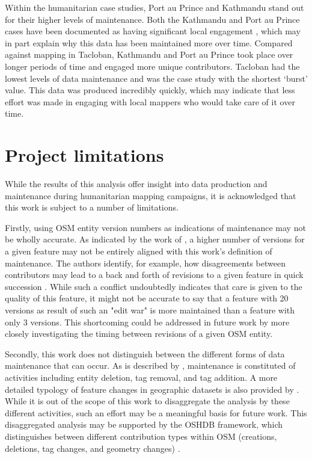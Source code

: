 Within the humanitarian case studies, Port au Prince and Kathmandu stand out for their higher levels of maintenance. Both the Kathmandu and Port au Prince cases have been documented as having significant local engagement \parencite{soden_crowdsourced_2014}, which may in part explain why this data has been maintained more over time. Compared against mapping in Tacloban, Kathmandu and Port au Prince took place over longer periods of time and engaged more unique contributors. Tacloban had the lowest levels of data maintenance and was the case study with the shortest ‘burst’ value. This data was produced incredibly quickly, which may indicate that less effort was made in engaging with local mappers who would take care of it over time. 

\section{Project limitations}

While the results of this analysis offer insight into data production and maintenance during humanitarian mapping campaigns, it is acknowledged that this work is subject to a number of limitations. 

Firstly, using OSM entity version numbers as indications of maintenance may not be wholly accurate. As indicated by the work of \textcite{mooney_characteristics_2012}, a higher number of versions for a given feature may not be entirely aligned with this work's definition of maintenance. The authors identify, for example, how disagreements between contributors may lead to a back and forth of revisions to a given feature in quick succession \textcite{mooney_characteristics_2012}. While such a conflict undoubtedly indicates that care is given to the quality of this  feature, it might not be accurate to say that a feature with 20 versions as result of such an "edit war" is more maintained than a feature with only 3 versions. This shortcoming could be addressed in future work by more closely investigating the timing between revisions of a given OSM entity. 

Secondly, this work does not distinguish between the different forms of data maintenance that can occur. As is described by \textcite{quattrone_work_2017}, maintenance is constituted of activities including entity deletion, tag removal, and tag addition. A more detailed typology of feature changes in geographic datasets is also provided by \textcite{rehrl_towards_2015}. While it is out of the scope of this work to disaggregate the analysis by these different activities, such an effort may be a meaningful basis for future work. This disaggregated analysis may be supported by the OSHDB framework, which distinguishes between different contribution types within OSM (creations, deletions, tag changes, and geometry changes) \parencite{heidelberg_institute_for_geoinformation_technology_oshdb_2020}. 

